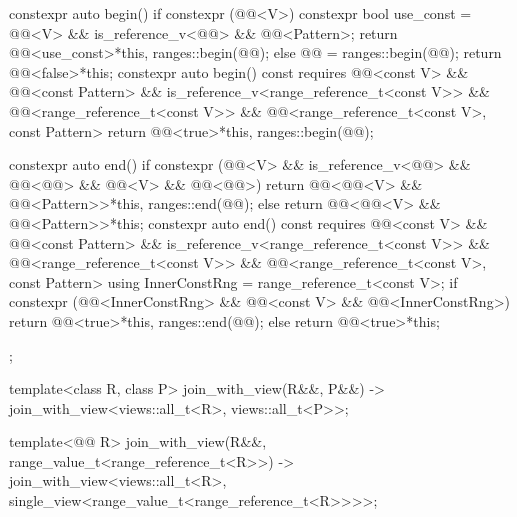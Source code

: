 \begin{codeblock}
{{    constexpr auto begin() {
      if constexpr (@@<V>) {
        constexpr bool use_const =
          @@<V> && is_reference_v<@@> && @@<Pattern>;
        return @@<use_const>{*this, ranges::begin(@@)};
      }
      else {
        @@ = ranges::begin(@@);
        return @@<false>{*this};
      }
    }
    constexpr auto begin() const
      requires @@<const V> &&
               @@<const Pattern> &&
               is_reference_v<range_reference_t<const V>> &&
               @@<range_reference_t<const V>> &&
               @@<range_reference_t<const V>, const Pattern> {
      return @@<true>{*this, ranges::begin(@@)};
    }

    constexpr auto end() {
      if constexpr (@@<V> &&
                    is_reference_v<@@> && @@<@@> &&
                    @@<V> && @@<@@>)
        return @@<@@<V> && @@<Pattern>>{*this, ranges::end(@@)};
      else
        return @@<@@<V> && @@<Pattern>>{*this};
    }
    constexpr auto end() const
      requires @@<const V> && @@<const Pattern> &&
               is_reference_v<range_reference_t<const V>> &&
               @@<range_reference_t<const V>> &&
               @@<range_reference_t<const V>, const Pattern> {
      using InnerConstRng = range_reference_t<const V>;
      if constexpr (@@<InnerConstRng> &&
                    @@<const V> && @@<InnerConstRng>)
        return @@<true>{*this, ranges::end(@@)};
      else
        return @@<true>{*this};
    }
  };

  template<class R, class P>
    join_with_view(R&&, P&&) -> join_with_view<views::all_t<R>, views::all_t<P>>;

  template<@@ R>
    join_with_view(R&&, range_value_t<range_reference_t<R>>)
      -> join_with_view<views::all_t<R>, single_view<range_value_t<range_reference_t<R>>>>;
}
\end{codeblock}

